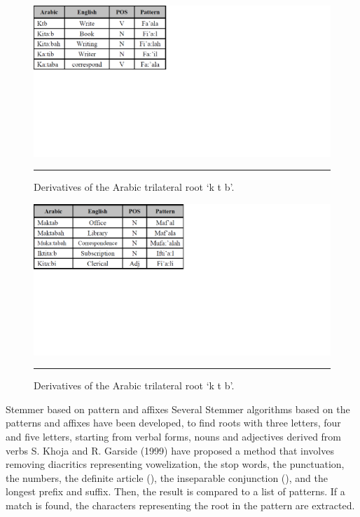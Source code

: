 \begin{figure}[htbp]
	\begin{center}
		\includegraphics{./Figures/pre_5.png}
		\rule{20em}{0.001pt}
	\end{center}
	\caption[Derivatives of the Arabic trilateral root ‘k t b’.]{Derivatives of the Arabic trilateral root ‘k t b’.}
	\label{fig:pre_5}
\end{figure}

\begin{figure}[htbp]
	\begin{center}
		\includegraphics{./Figures/pre_6.png}
		\rule{20em}{0.001pt}
	\end{center}
	\caption[Derivatives of the Arabic trilateral root ‘k t b’.]{Derivatives of the Arabic trilateral root ‘k t b’.}
	\label{fig:pre_6}
\end{figure}


Stemmer based on pattern and affixes Several Stemmer algorithms based on the patterns and affixes have been developed, to find roots with three letters, four and five letters, starting from verbal forms, nouns and adjectives derived from verbs S. Khoja and R. Garside (1999) have proposed a method that involves removing diacritics representing vowelization, the stop words, the punctuation, the numbers, the definite article (), the inseparable conjunction (), and the longest prefix and suffix. Then, the result is compared to a list of patterns. If a match is found, the characters representing the root in the pattern are extracted.
